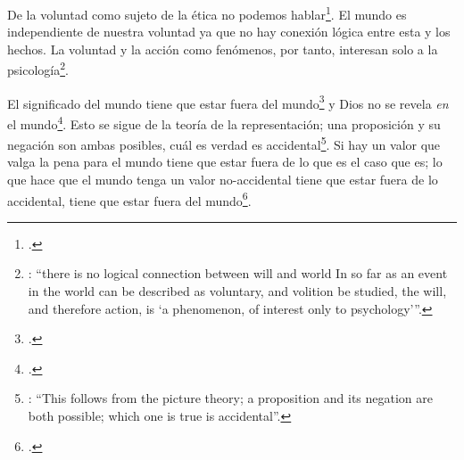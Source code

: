 De la voluntad como sujeto de la ética no podemos hablar\footcite[Cf.][\S6.423]{wittgenstein1922tractatuses}. El mundo es independiente de nuestra voluntad ya que no hay conexión lógica entre esta y los hechos. La voluntad y la acción como fenómenos, por tanto, interesan solo a la psicología\footnote{\cite[Cf.][171]{anscombe1959iwt}: \enquote{there is no logical connection between will and world \textelp{} In so far as an event in the world can be described as voluntary, and volition be studied, the will, and therefore action, is `a phenomenon, of interest only to psychology'}.}.

El significado del mundo tiene que estar fuera del mundo\footcite[Cf.][\S6.41]{wittgenstein1922tractatuses} y Dios no se revela \emph{en} el mundo\footcite[Cf.][\S6.432]{wittgenstein1922tractatuses}. Esto se sigue de la teoría de la representación; una proposición y su negación son ambas posibles, cuál es verdad es accidental\footnote{\cite[Cf.][170]{anscombe1959iwt}: \enquote{This follows from the picture theory; a proposition and its negation are both possible; which one is true is accidental}.}. Si hay un valor que valga la pena para el mundo tiene que estar fuera de lo que es el caso que es; lo que hace que el mundo tenga un valor no-accidental tiene que estar fuera de lo accidental, tiene que estar fuera del mundo\footcite[Cf.][\S6.41]{wittgenstein1922tractatuses}.

